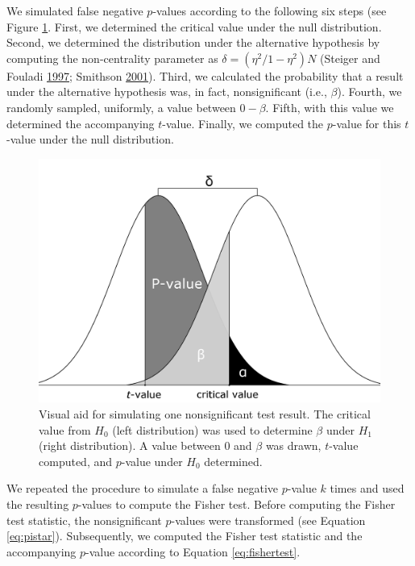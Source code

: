 \documentclass[a5paper]{book}
\begin{document}
We simulated false negative \(p\)-values according to the following six
steps (see Figure \ref{fig:appendix5a}. First, we determined the
critical value under the null distribution. Second, we determined the
distribution under the alternative hypothesis by computing the
non-centrality parameter as \(\delta=(\eta^2/1-\eta^2)N\) (Steiger and
Fouladi \protect\hyperlink{ref-Steiger1997-qq}{1997}; Smithson
\protect\hyperlink{ref-doi:10.1177ux2f00131640121971392}{2001}). Third,
we calculated the probability that a result under the alternative
hypothesis was, in fact, nonsignificant (i.e., \(\beta\)). Fourth, we
randomly sampled, uniformly, a value between \(0-\beta\). Fifth, with
this value we determined the accompanying \(t\)-value. Finally, we
computed the \(p\)-value for this \(t\)-value under the null
distribution.

\begin{figure}

{\centering \includegraphics[width=1\linewidth]{assets/figures/tgtbf-appendix_a} 

}

\caption{Visual aid for simulating one nonsignificant test result. The critical value from $H_0$ (left distribution) was used to determine $\beta$ under $H_1$ (right distribution). A value between 0 and $\beta$ was drawn, $t$-value computed, and $p$-value under $H_0$ determined.}\label{fig:appendix5a}
\end{figure}

We repeated the procedure to simulate a false negative \(p\)-value \(k\)
times and used the resulting \(p\)-values to compute the Fisher test.
Before computing the Fisher test statistic, the nonsignificant
\(p\)-values were transformed (see Equation \eqref{eq:pistar}).
Subsequently, we computed the Fisher test statistic and the accompanying
\(p\)-value according to Equation \eqref{eq:fishertest}.
\end{document}
